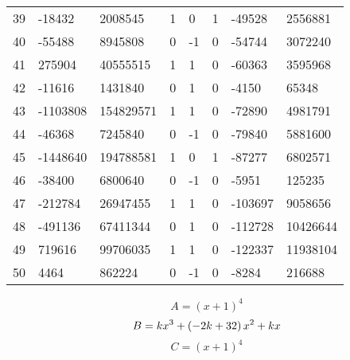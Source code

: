 \documentclass{amsart}
\begin{document}
\begin{longtable}{|l|l|l|lllll|}
39&-18432&2008545&1&0&1&-49528&2556881\\
40&-55488&8945808&0&-1&0&-54744&3072240\\
41&275904&40555515&1&1&0&-60363&3595968\\
42&-11616&1431840&0&1&0&-4150&65348\\
43&-1103808&154829571&1&1&0&-72890&4981791\\
44&-46368&7245840&0&-1&0&-79840&5881600\\
45&-1448640&194788581&1&0&1&-87277&6802571\\
46&-38400&6800640&0&-1&0&-5951&125235\\
47&-212784&26947455&1&1&0&-103697&9058656\\
48&-491136&67411344&0&1&0&-112728&10426644\\
49&719616&99706035&1&1&0&-122337&11938104\\
50&4464&862224&0&-1&0&-8284&216688\\
\hline
\end{longtable}
$$A=(x
 + 1)^{4}$$
$$B=k\*x^3
 + \left(-2\*k
 + 32\right) \*x^2
 + k\*x$$
$$C=(x
 + 1)^{4}$$
\end{document}
